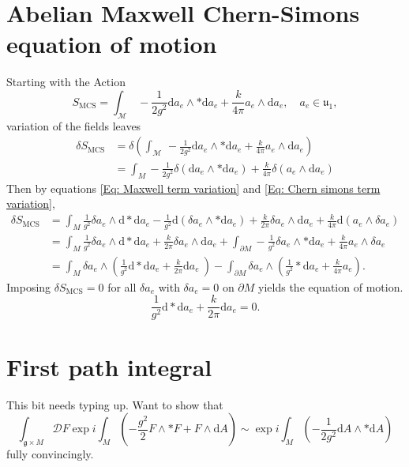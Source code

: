 \documentclass{article}
\begin{document}
\section{Abelian Maxwell Chern-Simons equation of motion}
\label{appendixamcseom}
Starting with the Action
\begin{equation}
    S_{\text{MCS}} = \int_{\mathcal{M}} \, -\frac{1}{2g^{2}} \mathrm{d}a_{e}\wedge * \mathrm{d}a_{e} + \frac{k}{4\pi}a_{e}\wedge \mathrm{d}a_{e},\quad a_{e}\in \mathfrak{u_{1}},
\end{equation}
variation of the fields leaves
\begin{align}
    \delta S_{\text{MCS}} &= \delta \left(\int_{\mathcal{M}} \, -\frac{1}{2g^{2}} \mathrm{d}a_{e}\wedge * \mathrm{d}a_{e} + \frac{k}{4\pi}a_{e}\wedge \mathrm{d}a_{e} \right)\nonumber \\
    &= \int_{M}-\frac{1}{2g^{2}}\delta\left(\mathrm{d}a_{e}\wedge * \mathrm{d}a_{e}\right)+\frac{k}{4\pi}\delta\left(a_{e}\wedge \mathrm{d}a_{e}\right)\nonumber
\end{align}
Then by equations \eqref{Eq: Maxwell term variation} and \eqref{Eq: Chern simons term variation}, 
\begin{align}
    \delta S_{\text{MCS}} &=\int_{M} \frac{1}{g^{2}}\delta a_{e}\wedge\mathrm{d}* \mathrm{d}a_{e} - \frac{1}{g^{2}}\mathrm{d}\left(\delta a_{e}\wedge * \mathrm{d}a_{e}\right) + \frac{k}{2\pi}\delta a_{e}\wedge \mathrm{d}a_{e} + \frac{k}{4\pi}\mathrm{d}\left(a_{e}\wedge \delta a_{e} \right)\nonumber\\
    &= \int_{M} \frac{1}{g^{2}}\delta a_{e}\wedge \mathrm{d}* \mathrm{d}a_{e} + \frac{k}{2\pi}\delta a_{e}\wedge \mathrm{d}a_{e} + \int_{\partial M}-\frac{1}{g^{2}}\delta a_{e}\wedge *\mathrm{d}a_{e} + \frac{k}{4\pi}a_{e}\wedge \delta a_{e}\nonumber\\
    &= \int_{M}\delta a_{e}\wedge \left(\frac{1}{g^{2}}\mathrm{d}* \mathrm{d}a_{e} + \frac{k}{2\pi}\mathrm{d}a_{e}\ \right)-\int_{\partial M}\delta a_{e}\wedge \left(\frac{1}{g^{2}}*\mathrm{d}a_{e} + \frac{k}{4\pi}a_{e}\right)\nonumber.
\end{align}
Imposing $\delta S_{\text{MCS}} = 0$ for all $\delta a_{e}$ with $\delta a_{e}=0$ on $\partial M$ yields the equation of motion.
\begin{equation}
    \frac{1}{g^{2}}\mathrm{d}*\mathrm{d}a_{e} + \frac{k}{2\pi}\mathrm{d}a_{e}=0.
\end{equation}

\section{First path integral}
\label{appendixfirstpathintegral}
\color{red}This bit needs typing up. Want to show that 
\begin{equation}
    \boxed{
    \int_{\mathfrak{g}\times M}\mathcal{D}F\exp i \int_{M}\left(-\frac{g^{2}}{2}F\wedge * F + F\wedge \mathrm{d}A \right)\sim \exp i \int_{M}\left(-\frac{1}{2g^{2}}\mathrm{d}A\wedge *\mathrm{d}A\right)
    }
\end{equation}
fully convincingly.
\color{black}
\end{document}
